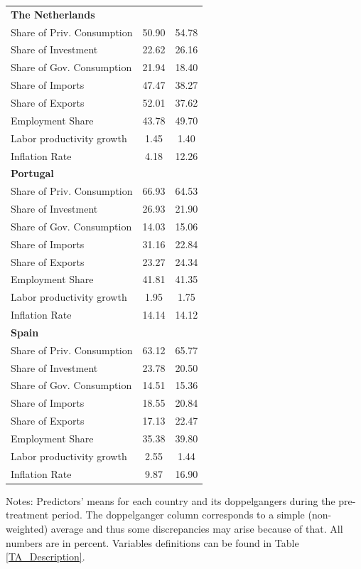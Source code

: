 \documentclass[12pt]{article}
\newcommand{\annote}[1]{\parbox{\textwidth}{\renewcommand{\baselinestretch}{1.0}\vspace{12pt} \small Notes: #1}}
\begin{document}
\begin{appendices}
\begin{center}
\begin{longtable}{lcc}
\textbf{The Netherlands} &  &  \\  
Share of Priv. Consumption &     50.90 &     54.78 \\  
Share of Investment &     22.62 &     26.16 \\  
Share of Gov. Consumption &     21.94 &     18.40 \\  
Share of Imports &     47.47 &     38.27 \\  
Share of Exports &     52.01 &     37.62 \\  
Employment Share &     43.78 &     49.70 \\  
Labor productivity growth &      1.45 &      1.40 \\  
Inflation Rate &      4.18 &     12.26  \\  \hline
\textbf{Portugal} &  &  \\  
Share of Priv. Consumption &     66.93 &     64.53 \\  
Share of Investment &     26.93 &     21.90 \\  
Share of Gov. Consumption &     14.03 &     15.06 \\  
Share of Imports &     31.16 &     22.84 \\  
Share of Exports &     23.27 &     24.34 \\  
Employment Share &     41.81 &     41.35 \\  
Labor productivity growth &      1.95 &      1.75 \\  
Inflation Rate &     14.14 &     14.12 \\   \hline
\textbf{Spain} &  &  \\  
Share of Priv. Consumption &     63.12 &     65.77 \\  
Share of Investment &     23.78 &     20.50 \\  
Share of Gov. Consumption &     14.51 &     15.36 \\  
Share of Imports &     18.55 &     20.84 \\  
Share of Exports &     17.13 &     22.47 \\  
Employment Share &     35.38 &     39.80 \\  
Labor productivity growth &      2.55 &      1.44 \\  
Inflation Rate &      9.87 &     16.90 \\  \hline
\hline \hline 
\end{longtable} 
\annote{Predictors' means for each country and its doppelgangers during the pre-treatment period. The doppelganger column corresponds to a simple (non-weighted) average and thus some discrepancies may arise because of that. All numbers are in percent. Variables definitions can be found in Table \ref{TA_Description}.}
\end{center}




\end{appendices}
\end{document}
